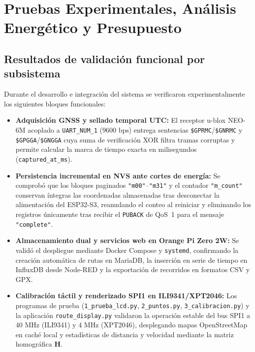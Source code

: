 \documentclass[12pt, letterpaper]{article}
\begin{document}
\vspace*{0.8cm}
\section*{\centering \fontsize{16}{17}\sffamily\selectfont Pruebas Experimentales, Análisis Energético y Presupuesto}

\subsection*{Resultados de validación funcional por subsistema}

Durante el desarrollo e integración del sistema se verificaron experimentalmente los siguientes bloques funcionales:

\begin{itemize}
    \item \textbf{Adquisición GNSS y sellado temporal UTC:} El receptor u-blox NEO-6M acoplado a \texttt{UART\_NUM\_1} ($9600\text{ bps}$) entrega sentencias \texttt{\$GPRMC}/\texttt{\$GNRMC} y \texttt{\$GPGGA}/\texttt{\$GNGGA} cuya suma de verificación XOR filtra tramas corruptas y permite calcular la marca de tiempo exacta en milisegundos (\texttt{captured\_at\_ms}).
    \item \textbf{Persistencia incremental en NVS ante cortes de energía:} Se comprobó que los bloques paginados \texttt{"m00"}--\texttt{"m31"} y el contador \texttt{"m\_count"} conservan íntegras las coordenadas almacenadas tras desconectar la alimentación del ESP32-S3, reanudando el conteo al reiniciar y eliminando los registros únicamente tras recibir el \texttt{PUBACK} de QoS~1 para el mensaje \texttt{"complete"}.
    \item \textbf{Almacenamiento dual y servicios web en Orange Pi Zero 2W:} Se validó el despliegue mediante Docker Compose y \texttt{systemd}, confirmando la creación automática de rutas en MariaDB, la inserción en serie de tiempo en InfluxDB desde Node-RED y la exportación de recorridos en formatos CSV y GPX.
    \item \textbf{Calibración táctil y renderizado SPI1 en ILI9341/XPT2046:} Los programas de prueba (\texttt{1\_prueba\_lcd.py}, \texttt{2\_puntos.py}, \texttt{3\_calibracion.py}) y la aplicación \texttt{route\_display.py} validaron la operación estable del bus SPI1 a $40\text{ MHz}$ (ILI9341) y $4\text{ MHz}$ (XPT2046), desplegando mapas OpenStreetMap en caché local y estadísticas de distancia y velocidad mediante la matriz homográfica $\mathbf{H}$.
\end{itemize}
\end{document}

